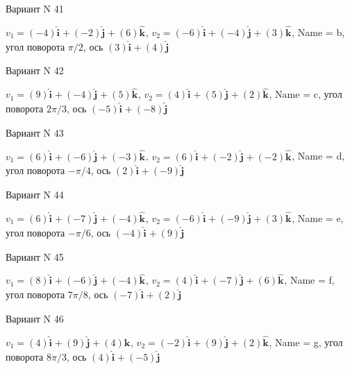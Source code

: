 \documentclass[11pt]{report}
\begin{document}
Вариант N 41

$v_1 = \left(-4\right)\mathbf{\hat{i}_{}} + \left(-2\right)\mathbf{\hat{j}_{}} + \left(6\right)\mathbf{\hat{k}_{}}$, $v_2 = \left(-6\right)\mathbf{\hat{i}_{}} + \left(-4\right)\mathbf{\hat{j}_{}} + \left(3\right)\mathbf{\hat{k}_{}}$, Name = b, угол поворота $\pi / 2$, ось $\left(3\right)\mathbf{\hat{i}_{}} + \left(4\right)\mathbf{\hat{j}_{}}$

Вариант N 42

$v_1 = \left(9\right)\mathbf{\hat{i}_{}} + \left(-4\right)\mathbf{\hat{j}_{}} + \left(5\right)\mathbf{\hat{k}_{}}$, $v_2 = \left(4\right)\mathbf{\hat{i}_{}} + \left(5\right)\mathbf{\hat{j}_{}} + \left(2\right)\mathbf{\hat{k}_{}}$, Name = c, угол поворота $2 \pi / 3$, ось $\left(-5\right)\mathbf{\hat{i}_{}} + \left(-8\right)\mathbf{\hat{j}_{}}$

Вариант N 43

$v_1 = \left(6\right)\mathbf{\hat{i}_{}} + \left(-6\right)\mathbf{\hat{j}_{}} + \left(-3\right)\mathbf{\hat{k}_{}}$, $v_2 = \left(6\right)\mathbf{\hat{i}_{}} + \left(-2\right)\mathbf{\hat{j}_{}} + \left(-2\right)\mathbf{\hat{k}_{}}$, Name = d, угол поворота $- \pi / 4$, ось $\left(2\right)\mathbf{\hat{i}_{}} + \left(-9\right)\mathbf{\hat{j}_{}}$

Вариант N 44

$v_1 = \left(6\right)\mathbf{\hat{i}_{}} + \left(-7\right)\mathbf{\hat{j}_{}} + \left(-4\right)\mathbf{\hat{k}_{}}$, $v_2 = \left(-6\right)\mathbf{\hat{i}_{}} + \left(-9\right)\mathbf{\hat{j}_{}} + \left(3\right)\mathbf{\hat{k}_{}}$, Name = e, угол поворота $- \pi / 6$, ось $\left(-4\right)\mathbf{\hat{i}_{}} + \left(9\right)\mathbf{\hat{j}_{}}$

Вариант N 45

$v_1 = \left(8\right)\mathbf{\hat{i}_{}} + \left(-6\right)\mathbf{\hat{j}_{}} + \left(-4\right)\mathbf{\hat{k}_{}}$, $v_2 = \left(4\right)\mathbf{\hat{i}_{}} + \left(-7\right)\mathbf{\hat{j}_{}} + \left(6\right)\mathbf{\hat{k}_{}}$, Name = f, угол поворота $7 \pi / 8$, ось $\left(-7\right)\mathbf{\hat{i}_{}} + \left(2\right)\mathbf{\hat{j}_{}}$

Вариант N 46

$v_1 = \left(4\right)\mathbf{\hat{i}_{}} + \left(9\right)\mathbf{\hat{j}_{}} + \left(4\right)\mathbf{\hat{k}_{}}$, $v_2 = \left(-2\right)\mathbf{\hat{i}_{}} + \left(9\right)\mathbf{\hat{j}_{}} + \left(2\right)\mathbf{\hat{k}_{}}$, Name = g, угол поворота $8 \pi / 3$, ось $\left(4\right)\mathbf{\hat{i}_{}} + \left(-5\right)\mathbf{\hat{j}_{}}$
\end{document}

